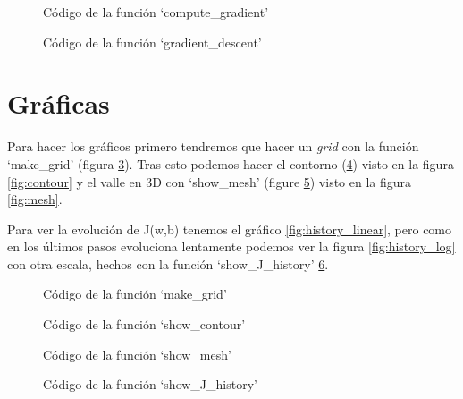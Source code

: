 \documentclass[6pt]{../../shared/AiTex}
\begin{document}
\begin{figure}[H]
    \centering
    
    \caption{Código de la función `compute\_gradient'}
    \label{fig:compute_gradient}
\end{figure}

\begin{figure}[H]
    \centering
    
    \caption{Código de la función `gradient\_descent'}
    \label{fig:gradient_descent}
\end{figure}

\section{Gráficas}

Para hacer los gráficos primero tendremos que hacer un \textit{grid} con la función `make\_grid' (figura \ref{fig:make_grid}). Tras esto podemos hacer el contorno (\ref{fig:show_contour}) visto en la figura \ref{fig:contour} y el valle en 3D con `show\_mesh' (figure \ref{fig:show_mesh}) visto en la figura \ref{fig:mesh}.

Para ver la evolución de J(w,b) tenemos el gráfico \ref{fig:history_linear}, pero como en los últimos pasos evoluciona lentamente podemos ver la figura \ref{fig:history_log} con otra escala, hechos con la función `show\_J\_history' \ref{fig:show_J_history}.

\begin{figure}[H]
    \centering
    
    \caption{Código de la función `make\_grid'}
    \label{fig:make_grid}
\end{figure}

\begin{figure}[H]
    \centering
    
    \caption{Código de la función `show\_contour'}
    \label{fig:show_contour}
\end{figure}

\begin{figure}[H]
    \centering
    
    \caption{Código de la función `show\_mesh'}
    \label{fig:show_mesh}
\end{figure}

\begin{figure}[H]
    \centering
    
    \caption{Código de la función `show\_J\_history'}
    \label{fig:show_J_history}
\end{figure}
\end{document}
